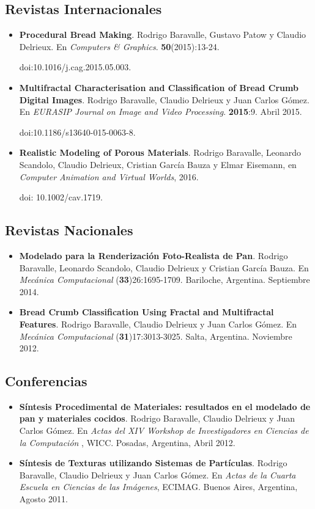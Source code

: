 \subsection*{Revistas Internacionales}

\begin{itemize}
\item {\bf Procedural Bread Making}. Rodrigo Baravalle, Gustavo Patow y Claudio Delrieux. En {\it Computers \& Graphics}. {\bf 50}(2015):13-24.

doi:10.1016/j.cag.2015.05.003.

\item {\bf Multifractal Characterisation and Classification of Bread Crumb Digital Images}. Rodrigo Baravalle, Claudio Delrieux y Juan Carlos Gómez. En {\it EURASIP Journal on Image and Video Processing}. {\bf 2015}:9. Abril 2015.

doi:10.1186/s13640-015-0063-8.

\item {\bf Realistic Modeling of Porous Materials}. Rodrigo Baravalle, Leonardo Scandolo, Claudio Delrieux, Cristian García Bauza y Elmar Eisemann, en {\it Computer Animation and Virtual Worlds}, 2016.

doi: 10.1002/cav.1719.
\end{itemize}


\subsection*{Revistas Nacionales}

\begin{itemize}
\item {\bf Modelado para la Renderización Foto-Realista de Pan}. Rodrigo Baravalle, Leonardo Scandolo, Claudio Delrieux y Cristian García Bauza. En {\it Mecánica Computacional} ({\bf 33})26:1695-1709. Bariloche, Argentina. Septiembre 2014.
\item {\bf Bread Crumb Classification Using Fractal and Multifractal Features}. Rodrigo Baravalle, Claudio Delrieux y Juan Carlos G\'omez. En {\it Mecánica Computacional} ({\bf 31})17:3013-3025. Salta, Argentina. Noviembre 2012.
\end{itemize}


\subsection*{Conferencias}
\begin{itemize}
\item {\bf Síntesis Procedimental de Materiales: resultados en el modelado de pan y materiales cocidos}. Rodrigo Baravalle, Claudio Delrieux y Juan Carlos G\'omez. En {\it Actas del XIV Workshop de Investigadores en Ciencias de la Computación }, WICC. Posadas, Argentina, Abril 2012.
\item {\bf Síntesis de Texturas utilizando Sistemas de Partículas}. Rodrigo Baravalle, Claudio Delrieux y Juan Carlos G\'omez. En {\it Actas de la Cuarta Escuela en Ciencias de las Imágenes}, ECIMAG. Buenos Aires, Argentina, Agosto 2011.
\end{itemize}

